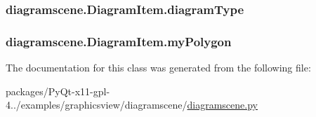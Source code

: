 \subsubsection[{diagram\+Type}]{\setlength{\rightskip}{0pt plus 5cm}diagramscene.\+Diagram\+Item.\+diagram\+Type}\label{classdiagramscene_1_1DiagramItem_a4e5f0d74ad318c06fec1bc95cbc2ecb8}
\hypertarget{classdiagramscene_1_1DiagramItem_af0588b29611f965dba52757a40a023f7}{}
\subsubsection[{my\+Polygon}]{\setlength{\rightskip}{0pt plus 5cm}diagramscene.\+Diagram\+Item.\+my\+Polygon}\label{classdiagramscene_1_1DiagramItem_af0588b29611f965dba52757a40a023f7}


The documentation for this class was generated from the following file\+:\begin{DoxyCompactItemize}
\item 
packages/\+Py\+Qt-\/x11-\/gpl-\/4../examples/graphicsview/diagramscene/\hyperlink{diagramscene_8py}{diagramscene.\+py}\end{DoxyCompactItemize}
